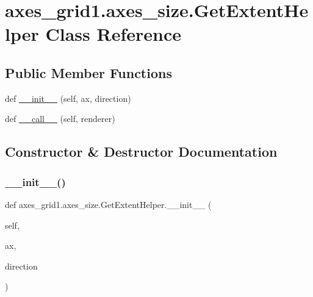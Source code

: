 \hypertarget{classaxes__grid1_1_1axes__size_1_1GetExtentHelper}{}\section{axes\+\_\+grid1.\+axes\+\_\+size.\+Get\+Extent\+Helper Class Reference}
\label{classaxes__grid1_1_1axes__size_1_1GetExtentHelper}
\subsection*{Public Member Functions}
\begin{DoxyCompactItemize}
\item 
def \hyperlink{classaxes__grid1_1_1axes__size_1_1GetExtentHelper_ac1a1e712a99993cb7693315a12ab70d4}{\+\_\+\+\_\+init\+\_\+\+\_\+} (self, ax, direction)
\item 
def \hyperlink{classaxes__grid1_1_1axes__size_1_1GetExtentHelper_ac0276776a6cb8c884bce61c9713606e4}{\+\_\+\+\_\+call\+\_\+\+\_\+} (self, renderer)
\end{DoxyCompactItemize}


\subsection{Constructor \& Destructor Documentation}
\mbox{\label{classaxes__grid1_1_1axes__size_1_1GetExtentHelper_ac1a1e712a99993cb7693315a12ab70d4}} 
\subsubsection{\texorpdfstring{\+\_\+\+\_\+init\+\_\+\+\_\+()}{\_\_init\_\_()}}
{\footnotesize\ttfamily def axes\+\_\+grid1.\+axes\+\_\+size.\+Get\+Extent\+Helper.\+\_\+\+\_\+init\+\_\+\+\_\+ (\begin{DoxyParamCaption}\item[{}]{self,  }\item[{}]{ax,  }\item[{}]{direction }\end{DoxyParamCaption})}



